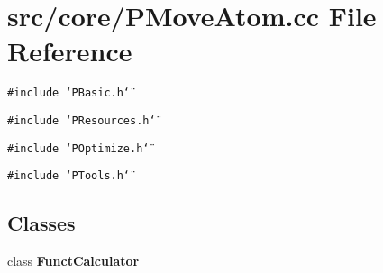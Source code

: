 \section{src/core/PMove\-Atom.cc File Reference}
\label{PMoveAtom_8cc}


{\tt \#include \char`\"{}PBasic.h\char`\"{}}\par
{\tt \#include \char`\"{}PResources.h\char`\"{}}\par
{\tt \#include \char`\"{}POptimize.h\char`\"{}}\par
{\tt \#include \char`\"{}PTools.h\char`\"{}}\par
\subsection*{Classes}
\begin{CompactItemize}
\item 
class {\bf Funct\-Calculator}
\end{CompactItemize}
